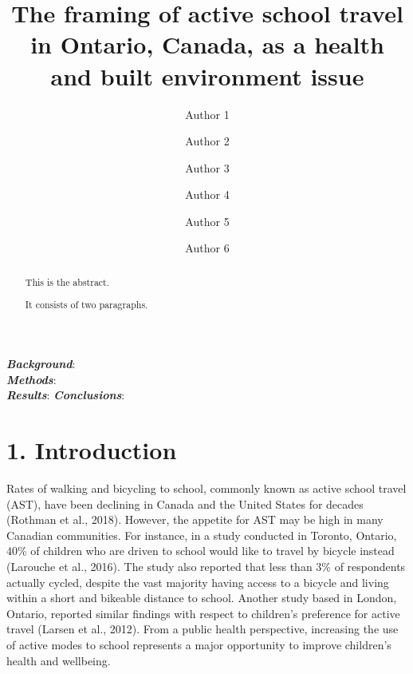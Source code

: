 \documentclass[]{elsarticle} %
\begin{document}
\begin{frontmatter}

  \title{The framing of active school travel in Ontario, Canada, as a
health and built environment issue}
    \author[Some Department]{Author 1}
    \author[Some Department]{Author 2}
    \author[Another University]{Author 3}
    \author[Some Institute]{Author 4}
    \author[Some University]{Author 5}
    \author[Some Department]{Author 6}
      \address[Some Department]{Department, Street, City, Province,
Postal Code}
    \address[Another University]{Department, Street, City, Province,
Postal Code}
    \address[Some Institute]{Street, City, Province, Postal Code}
    \address[Some University]{Department, Street, City, Province, Postal
Code}
  
  \begin{abstract}
  This is the abstract.

  It consists of two paragraphs.
  \end{abstract}
  
 \end{frontmatter}

\textbf{\emph{Background}}:\\
\textbf{\emph{Methods}}:\\
\textbf{\emph{Results}}: \textbf{\emph{Conclusions}}:

\newpage

\hypertarget{introduction}{%
\section{1. Introduction}\label{introduction}}

Rates of walking and bicycling to school, commonly known as active
school travel (AST), have been declining in Canada and the United States
for decades (Rothman et al., 2018). However, the appetite for AST may be
high in many Canadian communities. For instance, in a study conducted in
Toronto, Ontario, 40\% of children who are driven to school would like
to travel by bicycle instead (Larouche et al., 2016). The study also
reported that less than 3\% of respondents actually cycled, despite the
vast majority having access to a bicycle and living within a short and
bikeable distance to school. Another study based in London, Ontario,
reported similar findings with respect to children's preference for
active travel (Larsen et al., 2012). From a public health perspective,
increasing the use of active modes to school represents a major
opportunity to improve children's health and wellbeing.
\end{document}
